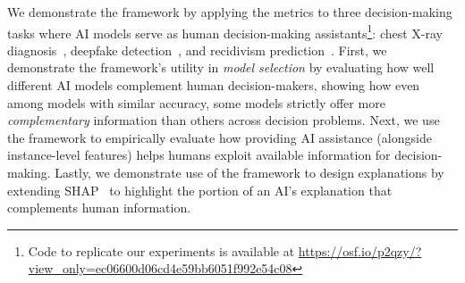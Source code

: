 We demonstrate the framework by applying the metrics to three decision-making tasks where AI models serve as human decision-making assistants\footnote{Code to replicate our experiments is available at \url{https://osf.io/p2qzy/?view_only=ec06600d06cd4e59bb6051f992e54c08}}: chest X-ray diagnosis~\citep{rajpurkar2018deep, johnson2019mimic}, deepfake detection~\citep{dolhansky2020deepfake, groh2022deepfake}, and recidivism prediction~\citep{angwin2022machine, dressel2018accuracy}. 
First, we demonstrate the framework's utility in \textit{model selection} by evaluating how well different AI models complement human decision-makers, showing how even among models with similar accuracy, some models strictly offer more \textit{complementary} information than others across decision problems.
Next, we use the framework to empirically evaluate how providing AI assistance (alongside instance-level features) helps humans exploit available information for decision-making. 
Lastly, we demonstrate use of the framework to design explanations by extending SHAP~\citep{lundberg2017unified} to highlight the portion of an AI’s explanation that complements human information.

\mvspace{-3mm}